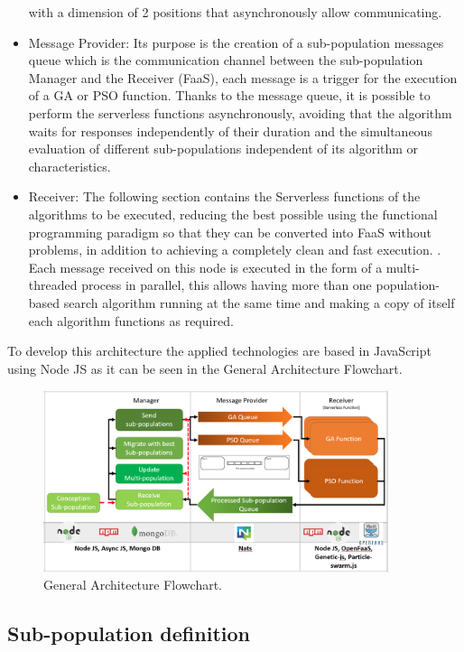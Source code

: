 \documentclass[runningheads]{llncs}
\begin{document}
\begin{itemize}
 with a dimension of 2 positions that asynchronously allow communicating.
\item Message Provider: Its purpose is the creation of a sub-population messages 
queue which is the communication channel between the sub-population Manager and
the Receiver (FaaS), each message is a trigger for the execution of a GA or PSO
function. Thanks to the message queue, it is possible to perform the serverless
functions asynchronously, avoiding that the algorithm waits for responses
independently of their duration and the simultaneous evaluation of different
sub-populations independent of its algorithm or characteristics.
\item Receiver: The following section contains the Serverless functions of the
algorithms to be executed, reducing the best possible using the functional
programming paradigm so that they can be converted into FaaS without problems,
in addition to achieving a completely clean and fast execution.
\cite{Roberts2016} . Each message received on this node is executed in the form
of a multi-threaded process in parallel, this allows having more than one
population-based search algorithm running at the same time and making a copy of
itself each algorithm functions as required.
\end{itemize}

To develop this architecture the applied technologies are based in JavaScript
using Node JS as it can be seen in the General Architecture Flowchart.

\begin{figure}[htp]
  \centering
  \includegraphics[width=0.9\textwidth]{img/general diagram architecture 2.png}
  \caption{General Architecture Flowchart.} \label{fig2}
  \end{figure}

\subsection{Sub-population definition}
\end{document}
